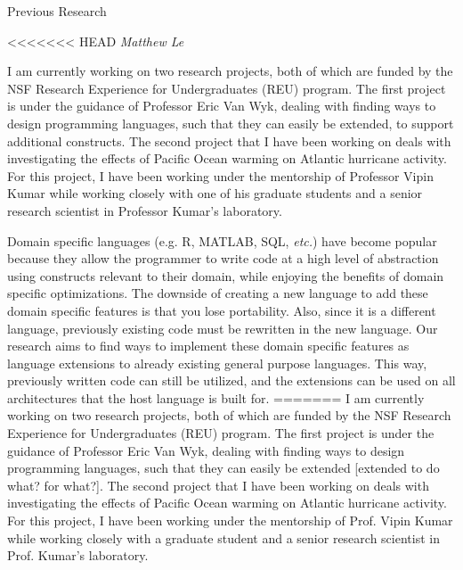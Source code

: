 \documentclass[a4paper,12pt]{article}
\begin{document}
\begin{center}
{\Large Previous Research}

<<<<<<< HEAD
\emph{Matthew Le}
\end{center}

I am currently working on two research projects, both of which are funded by the NSF Research Experience for Undergraduates (REU) program. The first project is under the guidance of Professor Eric Van Wyk, dealing with finding ways to design programming languages, such that they can easily be extended, to support additional constructs. The second project that I have been working on deals with investigating the effects of Pacific Ocean warming on Atlantic hurricane activity. For this project, I have been working under the mentorship of Professor Vipin Kumar while working closely with one of his graduate students and a senior research scientist in Professor Kumar's laboratory.

Domain specific languages (e.g. R, MATLAB, SQL, \textit{etc.}) have become popular because they allow the programmer to write code at a high level of abstraction using constructs relevant to their domain, while enjoying the benefits of domain specific optimizations. The downside of creating a new language to add these domain specific features is that you lose portability. Also, since it is a different language, previously existing code must be rewritten in the new language. Our research aims to find ways to implement these domain specific features as language extensions to already existing general purpose languages. This way, previously written code can still be utilized, and the extensions can be used on all architectures that the host language is built for.  
=======
I am currently working on two research projects, both of which are funded by the NSF Research Experience for Undergraduates (REU) program. The first project is under the guidance of Professor Eric Van Wyk, dealing with finding ways to design programming languages, such that they can easily be extended [extended to do what? for what?]. The second project that I have been working on deals with investigating the effects of Pacific Ocean warming on Atlantic hurricane activity. For this project, I have been working under the mentorship of Prof. Vipin Kumar while working closely with a graduate student and a senior research scientist in Prof. Kumar's laboratory.  
\end{document}
